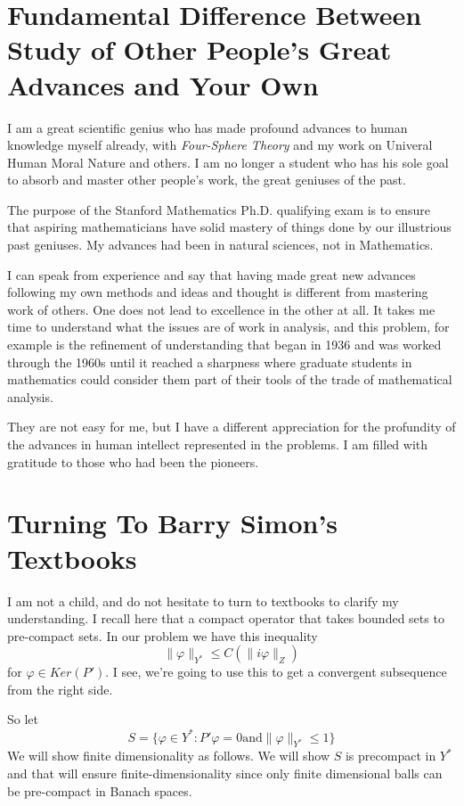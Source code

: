 \documentclass{amsart}
\begin{document}
\section{Fundamental Difference Between Study of Other People's Great Advances and Your Own}

I am a great scientific genius who has made profound advances to human knowledge myself already, with {\em Four-Sphere Theory} and my work on Univeral Human Moral Nature and others.  I am no longer a student who has his sole goal to absorb and master other people's work, the great geniuses of the past.

The purpose of the Stanford Mathematics Ph.D. qualifying exam is to ensure that aspiring mathematicians have solid mastery of things done by our illustrious past geniuses.  My advances had been in natural sciences, not in Mathematics.

I can speak from experience and say that having made great new advances following my own methods and ideas and thought is different from mastering work of others.  One does not lead to excellence in the other at all.  It takes me time to understand what the issues are of work in analysis, and this problem, for example is the refinement of understanding that began in 1936 and was worked through the 1960s until it reached a sharpness where graduate students in mathematics could consider them part of their tools of the trade of mathematical analysis.

They are not easy for me, but I have a different appreciation for the profundity of the advances in human intellect represented in the problems.  I am filled with gratitude to those who had been the pioneers.

\section{Turning To Barry Simon's Textbooks}

I am not a child, and do not hesitate to turn to textbooks to clarify my understanding.  I recall here that a compact operator that takes bounded sets to pre-compact sets.  In our problem we have this inequality 
\[
\| \varphi \|_{Y^*} \le C ( \| i \varphi \|_Z)
\]
for $\varphi \in Ker(P')$.  I see, we're going to use this to get a convergent subsequence from the right side.  

So let 
\[
S=\{ \varphi \in Y^*: P'\varphi = 0 \mathrm{ and } \| \varphi \|_{Y^*} \le 1 \}
\]
We will show finite dimensionality as follows.  We will show $S$ is precompact in $Y^*$ and that will ensure finite-dimensionality since only finite dimensional balls can be pre-compact in Banach spaces.  
\end{document}
